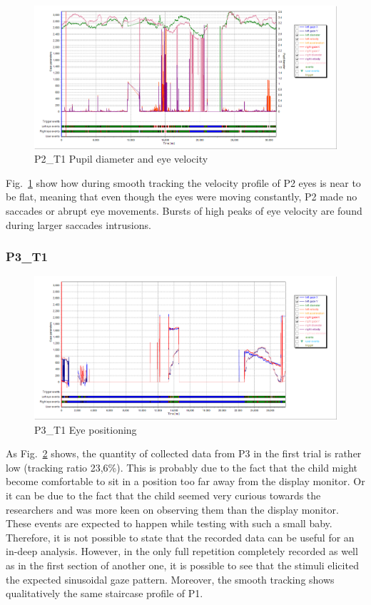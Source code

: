 \begin{figure}[h]
  \centering
  \includegraphics[width=.8\textwidth]{figures/graphs/P2_T1(sinusoid)_VP.png}
  \caption[P2\_T1 pupil velocity]{P2\_T1 Pupil diameter and eye velocity}
  \label{fig:P2_T1_vel}
\end{figure}

Fig.~\ref{fig:P2_T1_vel} show how during smooth tracking the velocity profile of P2 eyes is near to be flat, meaning that even though the eyes were moving constantly, P2 made no saccades or abrupt eye movements. Bursts of high peaks of eye velocity are found during larger saccades intrusions.



\subsubsection{P3\_T1}
\label{sec:P3_T1}

\begin{figure}[h]
  \centering
  \includegraphics[width=.8\textwidth]{figures/graphs/P3_T1(sinusoid)_XY.png}
  \caption[P3\_T1 Eye positioning]{P3\_T1 Eye positioning}
  \label{fig:P3_T1_pos}
\end{figure}

As Fig.~\ref{fig:P3_T1_pos} shows, the quantity of collected data from P3 in the first trial is rather low (tracking ratio 23,6\%). This is probably due to the fact that the child might become comfortable to sit in a position too far away from the display monitor. Or it can be due to the fact that the child seemed very curious towards the researchers and was more keen on observing them than the display monitor. These events are expected to happen while testing with such a small baby. Therefore, it is not possible to state that the recorded data can be useful for an in-deep analysis. However, in the only full repetition completely recorded as well as in the first section of another one, it is possible to see that the stimuli elicited the expected sinusoidal gaze pattern. Moreover, the smooth tracking shows qualitatively the same staircase profile of P1.

